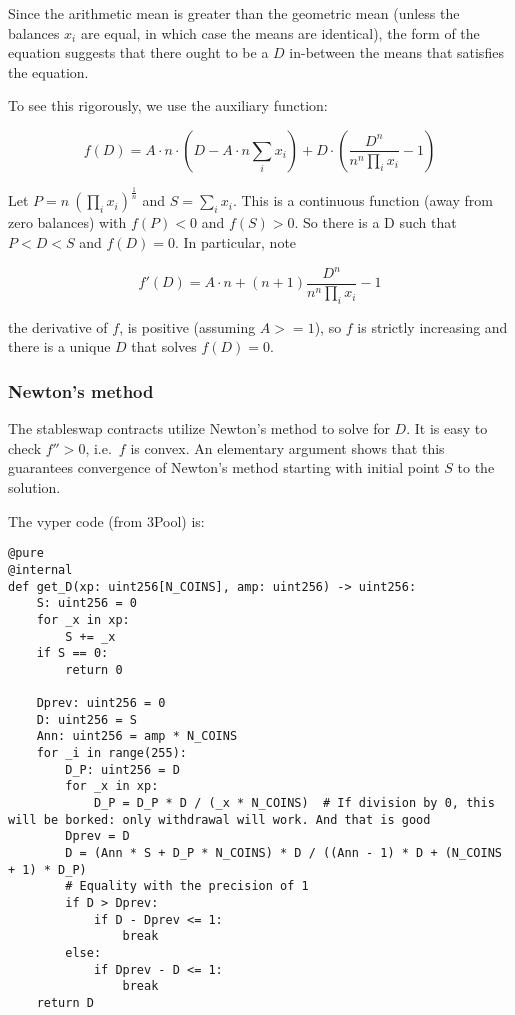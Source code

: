 \documentclass[
]{article}
\begin{document}
Since the arithmetic mean is greater than the geometric mean (unless the
balances \(x_i\) are equal, in which case the means are identical), the
form of the equation suggests that there ought to be a \(D\) in-between
the means that satisfies the equation.

To see this rigorously, we use the auxiliary function:

\[ f(D) = A \cdot n \cdot (D - A \cdot n  \sum_i x_i)  + D \cdot (\frac{D^{n}}{n^n \prod_i x_i} - 1) \]

Let \(P = n\ (\prod_i x_i)^{\frac{1}{n}}\) and \(S = \sum_i x_i\). This
is a continuous function (away from zero balances) with \(f(P) < 0\) and
\(f(S) > 0\). So there is a D such that \(P < D < S\) and \(f(D) = 0\).
In particular, note

\[ f'(D) = A\cdot n + (n+1) \frac{D^n}{n^n \prod_i x_i} - 1 \]

the derivative of \(f\), is positive (assuming \(A >= 1\)), so \(f\) is
strictly increasing and there is a unique \(D\) that solves
\(f(D) = 0\).

\hypertarget{newtons-method}{%
\subsubsection{Newton's method}\label{newtons-method}}

The stableswap contracts utilize Newton's method to solve for \(D\). It
is easy to check \(f'' > 0\), i.e.~\(f\) is convex. An elementary
argument shows that this guarantees convergence of Newton's method
starting with initial point \(S\) to the solution.

The vyper code (from 3Pool) is:

\begin{verbatim}
@pure
@internal
def get_D(xp: uint256[N_COINS], amp: uint256) -> uint256:
    S: uint256 = 0
    for _x in xp:
        S += _x
    if S == 0:
        return 0

    Dprev: uint256 = 0
    D: uint256 = S
    Ann: uint256 = amp * N_COINS
    for _i in range(255):
        D_P: uint256 = D
        for _x in xp:
            D_P = D_P * D / (_x * N_COINS)  # If division by 0, this will be borked: only withdrawal will work. And that is good
        Dprev = D
        D = (Ann * S + D_P * N_COINS) * D / ((Ann - 1) * D + (N_COINS + 1) * D_P)
        # Equality with the precision of 1
        if D > Dprev:
            if D - Dprev <= 1:
                break
        else:
            if Dprev - D <= 1:
                break
    return D
\end{verbatim}
\end{document}
